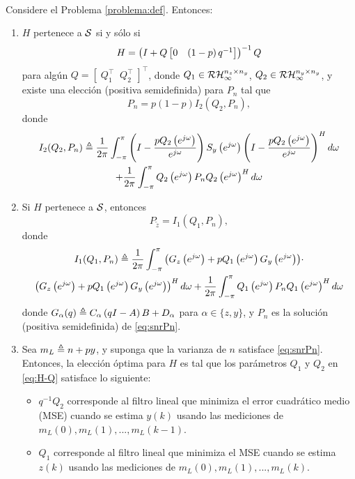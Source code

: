 \begin{teo}\label{coro:estructura}{\ \\}
Considere el Problema \ref{problema:def}. Entonces:
\begin{enumerate}
\item $H$ pertenece a $\cal{S}$ si y s\'olo si
\begin{equation} \label{eq:H-Q}
H = \left( I + Q \matriz{ 0 & \left( 1-p\right) q^{-1} } \right)^{-1} Q
\end{equation}
para alg\'un $Q=[\; Q_1^{\intercal} \;\; Q_2^{\intercal} \;]^{\intercal}$, donde $Q_1\in\cal{RH}_{\infty}^{n_z\times n_y}$, $Q_2 \in\cal{RH}_{\infty}^{n_y\times n_y}$, y existe una elecci\'on (positiva semidefinida) para $P_n$ tal que
\begin{equation}\label{eq:snrPn}
P_n=p(1-p)I_2\left(Q_2,P_n\right),
\end{equation}
donde
\begin{multline}
I_2(Q_2, P_n) \treq \frac{1}{2\pi}\int_{-\pi}^{\pi}{\left(I-\frac{pQ_2\left(e^{j\omega}\right)}{e^{j\omega}}\right)S_y\left(e^{j\omega}\right)\left(I-\frac{pQ_2\left(e^{j\omega}\right)}{e^{j\omega}}\right)^{H}d\omega} \\ + \frac{1}{2\pi}\int_{-\pi}^{\pi}{Q_2\left(e^{j\omega}\right)P_nQ_2\left(e^{j\omega}\right)^{H}d\omega}
\end{multline}
\item Si $H$ pertenece a $\cal{S}$, entonces 
\begin{equation}\label{eq:Pztilde}
P_{\tilde{z}}=I_1\left(Q_1,P_n\right),
\end{equation}
donde
\begin{multline}
I_1(Q_1, P_n) \treq \frac{1}{2\pi}\int_{-\pi}^{\pi}{\left(G_z\left(e^{j\omega}\right)+pQ_1\left(e^{j\omega}\right)G_y\left(e^{j\omega}\right)\right)}\cdot \\ \left(G_z\left(e^{j\omega}\right)+pQ_1\left(e^{j\omega}\right)G_y\left(e^{j\omega}\right)\right)^{H}d\omega + \frac{1}{2\pi}\int_{-\pi}^{\pi}{Q_1\left(e^{j\omega}\right)P_nQ_1\left(e^{j\omega}\right)^{H}d\omega}
\end{multline}
donde $G_{\alpha}(q)\treq C_{\alpha}\left(qI-A\right)B+D_{\alpha}$ para $\alpha \in \{ z,y\}$, y $P_n$ es la soluci\'on (positiva semidefinida) de \eqref{eq:snrPn}.
\item Sea $m_L \treq n+py$, y suponga que la varianza de $n$ satisface \eqref{eq:snrPn}. Entonces, la elecci\'on \'optima para $H$ es tal que los par\'ametros $Q_1$ y $Q_2$ en \eqref{eq:H-Q} satisface lo siguiente:
\begin{itemize}
\item $q^{-1}Q_2$ corresponde al filtro lineal que minimiza el error cuadr\'atico medio (MSE) cuando se estima $y(k)$ usando las mediciones de $m_L(0),m_L(1),...,m_L(k-1)$.
\item $Q_1$ corresponde al filtro lineal que minimiza el MSE cuando se estima $z(k)$ usando las mediciones de $m_L(0),m_L(1),...,m_L(k)$.
\end{itemize}
\end{enumerate}
\end{teo}

